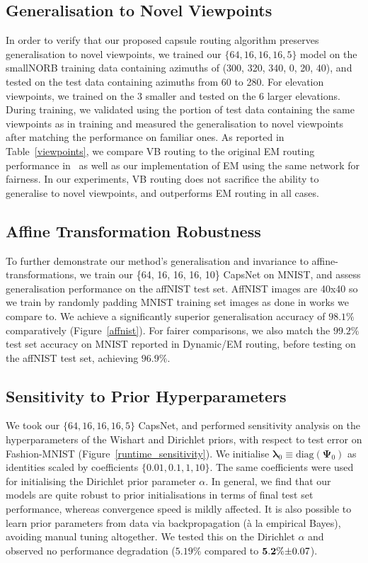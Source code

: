 \documentclass[letterpaper]{article} \usepackage{aaai20}  \usepackage{times}  \usepackage{helvet} \usepackage{courier}  \usepackage[hyphens]{url}  \usepackage{graphicx} \urlstyle{rm} \def\UrlFont{\rm}  \usepackage{graphicx}  \frenchspacing  \setlength{\pdfpagewidth}{8.5in}  \setlength{\pdfpageheight}{11in}  \nocopyright
\begin{document}
\subsection{Generalisation to Novel Viewpoints}
In order to verify that our proposed capsule routing algorithm preserves generalisation to novel viewpoints, we trained our $\{64, 16, 16, 16, 5\}$ model on the smallNORB training data containing azimuths of (300, 320, 340, 0, 20, 40), and tested on the test data containing azimuths from 60 to 280. For elevation viewpoints, we trained on the 3 smaller and tested on the 6 larger elevations. During training, we validated using the portion of test data containing the same viewpoints as in training and measured the generalisation to novel viewpoints after matching the performance on familiar ones. As reported in Table~\ref{viewpoints}, we compare VB routing to the original EM routing performance in~\cite{hinton2018matrix} as well as our implementation of EM using the same network for fairness. In our experiments, VB routing does not sacrifice the ability to generalise to novel viewpoints, and outperforms EM routing in all cases.
\subsection{Affine Transformation Robustness}
To further demonstrate our method’s generalisation and invariance to affine-transformations, we train our \{64, 16, 16, 16, 10\} CapsNet on MNIST, and assess generalisation performance on the affNIST test set. AffNIST images are 40x40 so we train by randomly padding MNIST training set images as done in works we compare to. We achieve a significantly superior generalisation accuracy of $\mathbf{98.1\%}$ comparatively (Figure~\ref{affnist}). For fairer comparisons, we also match the $\mathbf{99.2\%}$ test set accuracy on MNIST reported in Dynamic/EM routing, before testing on the affNIST test set, achieving $\mathbf{96.9\%}$.
\subsection{Sensitivity to Prior Hyperparameters}
\label{priors}
We took our $\{64, 16, 16, 16, 5\}$ CapsNet, and performed sensitivity analysis on the hyperparameters of the Wishart and Dirichlet priors, with respect to test error on Fashion-MNIST (Figure~\ref{runtime_sensitivity}). We initialise $\boldsymbol{\lambda}_0 \equiv \mathrm{diag}(\boldsymbol{\Psi}_0)$ as identities scaled by coefficients $\{0.01, 0.1, 1, 10\}$. The same coefficients were used for initialising the Dirichlet prior parameter $\alpha$. In general, we find that our models are quite robust to prior initialisations in terms of final test set performance, whereas convergence speed is mildly affected. It is also possible to learn prior parameters from data via backpropagation (à la empirical Bayes), avoiding manual tuning altogether. We tested this on the Dirichlet $\alpha$ and observed no performance degradation ($\mathbf{5.19\%}$ compared to $\mathbf{5.2}\% \scriptsize{\pm 0.07}$).
\end{document}
